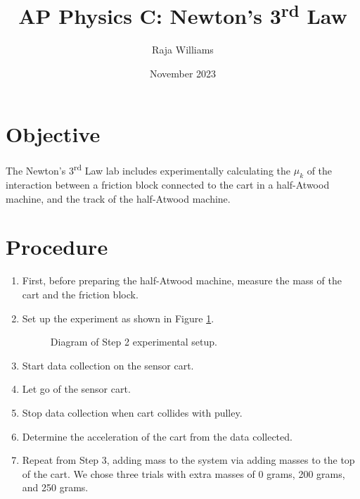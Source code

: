 \documentclass[12pt]{article}
\begin{document}
\title{AP Physics C: Newton's 3\textsuperscript{rd} Law}
\author{Raja Williams}
\date{November 2023}
\maketitle

\section{Objective}
The Newton's 3\textsuperscript{rd} Law lab includes experimentally calculating
the $\mu_k$ of the interaction between a friction block connected to the cart in
a half-Atwood machine, and the track of the half-Atwood machine.

\section{Procedure}
\begin{enumerate}
    \item First, before preparing the half-Atwood machine, measure the mass of
        the cart and the friction block.
    \item Set up the experiment as shown in Figure \ref{fig:step2}.
    \begin{figure}[h]
        \centering
        \caption{Diagram of Step 2 experimental setup.}
        \label{fig:step2}
    \end{figure}
    \item Start data collection on the sensor cart.
    \item Let go of the sensor cart.
    \item Stop data collection when cart collides with pulley.
    \item Determine the acceleration of the cart from the data collected.
    \item Repeat from Step 3, adding mass to the system via adding masses to the
        top of the cart. We chose three trials with extra masses of 0 grams, 200
        grams, and 250 grams.
\end{enumerate}
\end{document}
